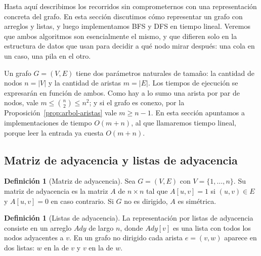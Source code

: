 \documentclass[12pt, spanish, oneside, openany]{book}
\theoremstyle{uprightplain}
\theoremstyle{definition}
\newtheorem{definicion}[teorema]{Definición}
\theoremstyle{remark}
\theoremstyle{definition}
\begin{document}
Hasta aquí describimos los recorridos sin comprometernos con una representación concreta del grafo. En esta sección discutimos cómo representar un grafo con arreglos y listas, y luego implementamos BFS y DFS en tiempo lineal. Veremos que ambos algoritmos son esencialmente el mismo, y que difieren solo en la estructura de datos que usan para decidir a qué nodo mirar después: una cola en un caso, una pila en el otro.

Un grafo $G=(V,E)$ tiene dos parámetros naturales de tamaño: la cantidad de nodos $n=|V|$ y la cantidad de aristas $m=|E|$. Los tiempos de ejecución se expresarán en función de ambos. Como hay a lo sumo una arista por par de nodos, vale $m\le \binom{n}{2}\le n^2$; y si el grafo es conexo, por la Proposición~\ref{prop:arbol-aristas} vale $m\ge n-1$. En esta sección apuntamos a implementaciones de tiempo $O(m+n)$, al que llamaremos tiempo lineal, porque leer la entrada ya cuesta $O(m+n)$.

\subsection{Matriz de adyacencia y listas de adyacencia}

\begin{definicion}[Matriz de adyacencia]
\label{def:matriz-ady}
Sea $G=(V,E)$ con $V=\{1,\dots,n\}$. Su matriz de adyacencia es la matriz $A$ de $n\times n$ tal que $A[u,v]=1$ si $(u,v)\in E$ y $A[u,v]=0$ en caso contrario. Si $G$ no es dirigido, $A$ es simétrica.
\end{definicion}

\begin{definicion}[Listas de adyacencia]
\label{def:lista-ady}
La representación por listas de adyacencia consiste en un arreglo $\mathit{Ady}$ de largo $n$, donde $\mathit{Ady}[v]$ es una lista con todos los nodos adyacentes a $v$. En un grafo no dirigido cada arista $e=(v,w)$ aparece en dos listas: $w$ en la de $v$ y $v$ en la de $w$.
\end{definicion}
\end{document}

